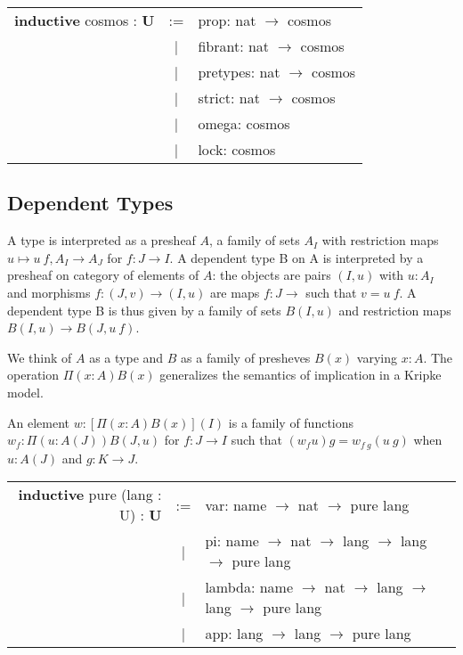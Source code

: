 \documentclass[a4paper,UKenglish,cleveref, autoref, thm-restate]{lipics-v2021}
\begin{document}
\begin{table}[ht]
\begin{tabular}{rcl}
  \textbf{inductive} cosmos : \textbf{U}& := & prop: nat $\rightarrow$ cosmos \\
   &|& fibrant: nat $\rightarrow$ cosmos \\
   &|& pretypes: nat $\rightarrow$ cosmos \\
   &|& strict: nat $\rightarrow$ cosmos \\
   &|& omega: cosmos \\
   &|& lock: cosmos \\
\end{tabular}
\end{table}

\newpage

\subsection{Dependent Types}

\begin{definition}[Type]
A type is interpreted as a presheaf $A$, a family of sets $A_I$ with restriction maps
$u \mapsto u\ f, A_I \rightarrow A_J$ for $f: J\rightarrow I$. A dependent type
B on A is interpreted by a presheaf on category of elements of $A$: the objects
are pairs $(I,u)$ with $u : A_I$ and morphisms $f: (J,v) \rightarrow (I,u)$ are
maps $f : J \rightarrow$ such that $v = u\ f$. A dependent type B is thus given
by a family of sets $B(I,u)$ and restriction maps $B(I,u) \rightarrow B(J,u\ f)$.
\end{definition}


We think of $A$ as a type and $B$ as a family of presheves $B(x)$ varying $x:A$.
The operation $\Pi(x:A)B(x)$ generalizes the semantics of
implication in a Kripke model.

\begin{definition}[Pi]
An element $w:[\Pi(x:A)B(x)](I)$ is a family of functions $w_f : \Pi(u:A(J))B(J,u)$
for $f : J \rightarrow I$ such that $(w_f u)g=w_{f\ g}(u\ g)$ when $u:A(J)$ and $g:K\rightarrow J$.
\end{definition}

\begin{table}[ht]
\begin{tabular}{rcl}
  \textbf{inductive} pure (lang : U) : \textbf{U}& := & var: name $\rightarrow$ nat $\rightarrow$ pure lang \\
  &|& pi: name $\rightarrow$ nat $\rightarrow$ lang $\rightarrow$ lang $\rightarrow$ pure lang \\
  &|& lambda: name $\rightarrow$ nat $\rightarrow$ lang $\rightarrow$ lang $\rightarrow$ pure lang \\
  &|& app: lang $\rightarrow$ lang $\rightarrow$ pure lang \\
\end{tabular}
\end{table}
\end{document}
